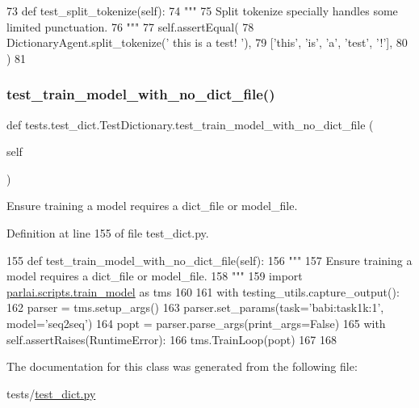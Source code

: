 \begin{DoxyCode}
73     \textcolor{keyword}{def }test\_split\_tokenize(self):
74         \textcolor{stringliteral}{"""}
75 \textcolor{stringliteral}{        Split tokenize specially handles some limited punctuation.}
76 \textcolor{stringliteral}{        """}
77         self.assertEqual(
78             DictionaryAgent.split\_tokenize(\textcolor{stringliteral}{'   this is a test!   '}),
79             [\textcolor{stringliteral}{'this'}, \textcolor{stringliteral}{'is'}, \textcolor{stringliteral}{'a'}, \textcolor{stringliteral}{'test'}, \textcolor{stringliteral}{'!'}],
80         )
81 
\end{DoxyCode}
\mbox{\label{classtests_1_1test__dict_1_1TestDictionary_a33993874a2fa2dc57b3936479b17aae1}} 
\subsubsection{\texorpdfstring{test\+\_\+train\+\_\+model\+\_\+with\+\_\+no\+\_\+dict\+\_\+file()}{test\_train\_model\_with\_no\_dict\_file()}}
{\footnotesize\ttfamily def tests.\+test\+\_\+dict.\+Test\+Dictionary.\+test\+\_\+train\+\_\+model\+\_\+with\+\_\+no\+\_\+dict\+\_\+file (\begin{DoxyParamCaption}\item[{}]{self }\end{DoxyParamCaption})}

\begin{DoxyVerb}Ensure training a model requires a dict_file or model_file.
\end{DoxyVerb}
 

Definition at line 155 of file test\+\_\+dict.\+py.


\begin{DoxyCode}
155     \textcolor{keyword}{def }test\_train\_model\_with\_no\_dict\_file(self):
156         \textcolor{stringliteral}{"""}
157 \textcolor{stringliteral}{        Ensure training a model requires a dict\_file or model\_file.}
158 \textcolor{stringliteral}{        """}
159         \textcolor{keyword}{import} \hyperlink{namespaceparlai_1_1scripts_1_1train__model}{parlai.scripts.train\_model} \textcolor{keyword}{as} tms
160 
161         with testing\_utils.capture\_output():
162             parser = tms.setup\_args()
163             parser.set\_params(task=\textcolor{stringliteral}{'babi:task1k:1'}, model=\textcolor{stringliteral}{'seq2seq'})
164             popt = parser.parse\_args(print\_args=\textcolor{keyword}{False})
165             with self.assertRaises(RuntimeError):
166                 tms.TrainLoop(popt)
167 
168 
\end{DoxyCode}


The documentation for this class was generated from the following file\+:\begin{DoxyCompactItemize}
\item 
tests/\hyperlink{test__dict_8py}{test\+\_\+dict.\+py}\end{DoxyCompactItemize}

